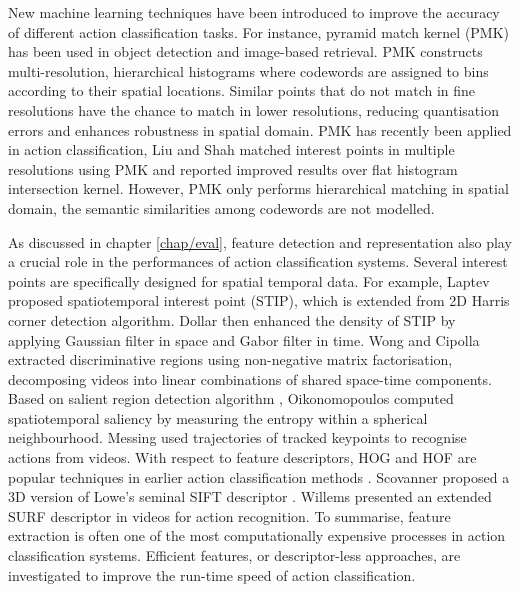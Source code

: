 New machine learning techniques have been introduced to improve the accuracy of different action classification tasks.  
For instance, pyramid match kernel (PMK) \cite{Grauman2005} has been used in object detection and image-based retrieval. PMK constructs multi-resolution, hierarchical histograms where codewords are assigned to bins according to their spatial locations. Similar points that do not match in fine resolutions have the chance to match in lower resolutions, reducing quantisation errors and enhances robustness in spatial domain. PMK has recently been applied in action classification, Liu and Shah \cite{Liu2008} matched interest points in multiple resolutions using PMK and reported improved results over flat histogram intersection kernel. 
However, PMK only performs hierarchical matching in spatial domain, the semantic similarities among codewords are not modelled.  

As discussed in chapter \ref{chap/eval}, feature detection and representation also play a crucial role in the performances of action classification systems. Several interest points are specifically designed for spatial temporal data. For example, Laptev \cite{Laptev2005} proposed spatiotemporal interest point (STIP), which is extended from 2D Harris corner detection algorithm. Dollar \etal \cite{Dollar2005} then enhanced the density of STIP by applying Gaussian filter in space and Gabor filter in time.  
Wong and Cipolla \cite{Wong2007a} extracted discriminative regions using non-negative matrix factorisation, decomposing videos into linear combinations of shared space-time components.
Based on salient region detection algorithm \cite{Mikolajczyk2004}, Oikonomopoulos \etal \cite{Oikonomopoulos2005} computed spatiotemporal saliency by measuring the entropy within a spherical neighbourhood. Messing \etal \cite{Messing2009} used trajectories of tracked keypoints to recognise actions from videos. 
With respect to feature descriptors, HOG and HOF are popular techniques in earlier action classification methods \cite{Dollar2005, Niebles2008, Schuldt2004}. Scovanner \etal \cite{Scovanner2007} proposed a 3D version of Lowe's seminal SIFT descriptor \cite{Lowe2004}. Willems \etal \cite{Willems2009} presented an extended SURF descriptor in videos for action recognition.  
To summarise, feature extraction is often one of the most computationally expensive processes in action classification systems. Efficient features, or descriptor-less approaches, are investigated to improve the run-time speed of action classification.  

